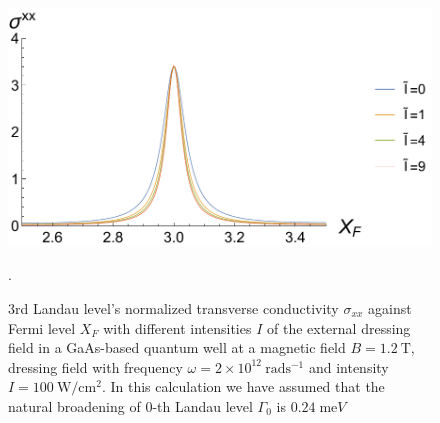 \begin{figure}[t]
\includegraphics[scale=0.55]{figures/fig_6}
\caption{\label{fig_1} $3$rd Landau level’s normalized transverse conductivity $\sigma_{xx}$ against Fermi level $X_F$ with different intensities $I$ of the external dressing field in a GaAs-based quantum well at a magnetic field $B = 1.2~\text{T}$, dressing field with frequency $\omega =2\times10^{12}~\text{rad}\text{s}^{-1}$ and intensity $I =100~\text{W}/\text{cm}^{2}$. In this calculation we have assumed that the natural  broadening of $0$-th Landau level $\Gamma_0$ is $0.24\;\text{me}V$}.
\end{figure}
